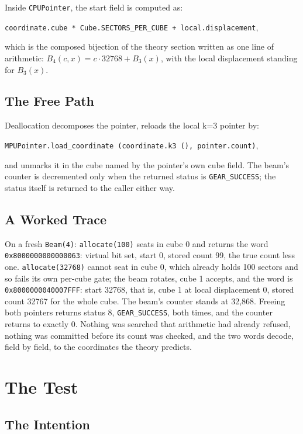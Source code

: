 \documentclass{article}
\begin{document}
Inside \texttt{CPUPointer}, the start field is computed as:
\begin{center}
    \texttt{coordinate.cube * Cube.SECTORS\_PER\_CUBE + local.displacement},\\
\end{center}
which is the composed bijection of the theory section written as one line of arithmetic: $B_4(c, x) = c \cdot 32768 + B_3(x)$, with the local displacement standing for $B_3(x)$.

\subsection{The Free Path}

Deallocation decomposes the pointer, reloads the local k=3 pointer by:
\begin{center}
\texttt{MPUPointer.load\_coordinate (coordinate.k3 (), pointer.count)}, 
\end{center}
and unmarks it in the cube named by the pointer's own cube field. The beam's counter is decremented only when the returned status is \texttt{GEAR\_SUCCESS}; the status itself is returned to the caller either way.

\subsection{A Worked Trace}

On a fresh \texttt{Beam(4)}: \texttt{allocate(100)} seats in cube 0 and returns the word \texttt{0x8000000000000063}: virtual bit set, start 0, stored count 99, the true count less one. \texttt{allocate(32768)} cannot seat in cube 0, which already holds 100 sectors and so fails its own per-cube gate; the beam rotates, cube 1 accepts, and the word is \texttt{0x8000000040007FFF}: start 32768, that is, cube 1 at local displacement 0, stored count 32767 for the whole cube. The beam's counter stands at 32,868. Freeing both pointers returns status 8, \texttt{GEAR\_SUCCESS}, both times, and the counter returns to exactly 0. Nothing was searched that arithmetic had already refused, nothing was committed before its count was checked, and the two words decode, field by field, to the coordinates the theory predicts.

\section{The Test}

\subsection{The Intention}
\end{document}
